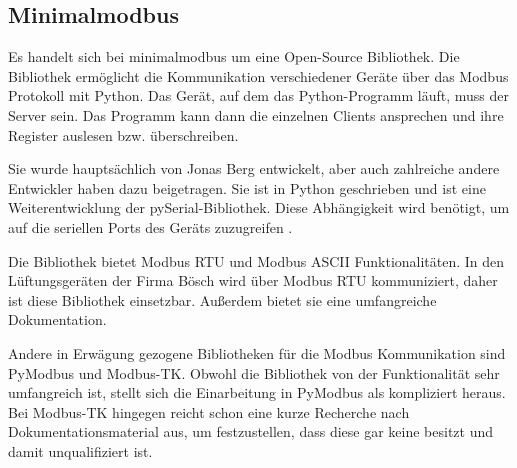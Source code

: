 \subsection{Minimalmodbus}
Es handelt sich bei minimalmodbus um eine Open-Source Bibliothek. Die Bibliothek ermöglicht die Kommunikation verschiedener Geräte über das Modbus Protokoll mit Python. Das Gerät, auf dem das Python-Programm läuft, muss der Server sein. Das Programm kann dann die einzelnen Clients ansprechen und ihre Register auslesen bzw. überschreiben.

Sie wurde hauptsächlich von Jonas Berg entwickelt, aber auch zahlreiche andere Entwickler haben dazu beigetragen. Sie ist in Python geschrieben und ist eine Weiterentwicklung der pySerial-Bibliothek. Diese Abhängigkeit wird benötigt, um auf die seriellen Ports des Geräts zuzugreifen \cite{Liechti_pySerial:o.J.}. 

Die Bibliothek bietet Modbus RTU und Modbus ASCII Funktionalitäten. In den Lüftungsgeräten der Firma Bösch wird über Modbus RTU kommuniziert, daher ist diese Bibliothek einsetzbar. Außerdem bietet sie eine umfangreiche Dokumentation.
\cite{Berg_MiniModbus:2023, Berg_MiniModbus_Git:2023} 

Andere in Erwägung gezogene Bibliotheken für die Modbus Kommunikation sind PyModbus und Modbus-TK. Obwohl die Bibliothek von der Funktionalität sehr umfangreich ist, stellt sich die Einarbeitung in PyModbus als kompliziert heraus. Bei Modbus-TK hingegen reicht schon eine kurze Recherche nach Dokumentationsmaterial aus, um festzustellen, dass diese gar keine besitzt und damit unqualifiziert ist.